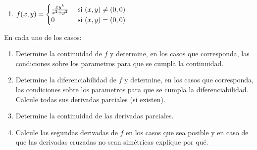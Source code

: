 {\begin{multicols}{2}
\begin{enumerate}
\item $f(x,y)=\begin{cases}
\frac{xy^k}{x^2+y^2}&\text{ si } (x,y)\neq(0,0) \cr
0                   &\text{ si } (x,y)=   (0,0)
\end{cases}$
\end{enumerate}
\end{multicols}
En cada uno de los casos:
\begin{enumerate}
\item Determine la continuidad de $f$ y determine, en los casos que corresponda, las condiciones sobre los parametros para que se cumpla la continuidad.
\item Determine la diferenciabilidad de $f$ y determine, en los casos que corresponda, las condiciones sobre los parametros para que se cumpla la diferenciabilidad. Calcule todas sus derivadas parciales (si existen).
\item Determine la continuidad de las derivadas parciales.
\item Calcule las segundas derivadas de $f$ en los casos que sea posible y en caso de que las derivadas cruzadas no sean sim\'etricas explique por qu\'e.
\end{enumerate}
}



